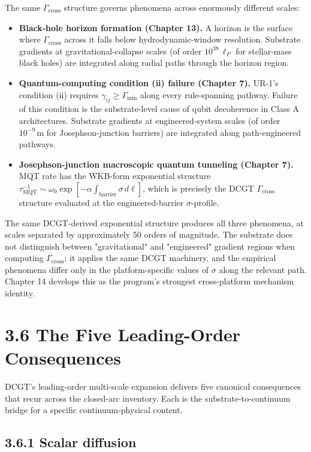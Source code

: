 \documentclass[11pt]{book}
\begin{document}
The same $\Gamma_\mathrm{cross}$ structure governs phenomena across enormously different scales:

\begin{itemize}
\item \textbf{Black-hole horizon formation (Chapter 13).} A horizon is the surface where $\Gamma_\mathrm{cross}$ across it falls below hydrodynamic-window resolution. Substrate gradients at gravitational-collapse scales (of order $10^{38}\,\ell_P$ for stellar-mass black holes) are integrated along radial paths through the horizon region.
\item \textbf{Quantum-computing condition (ii) failure (Chapter 7).} UR-1's condition (ii) requires $\gamma_{ij} \geq \Gamma_\mathrm{min}$ along every rule-spanning pathway. Failure of this condition is the substrate-level cause of qubit decoherence in Class A architectures. Substrate gradients at engineered-system scales (of order $10^{-9}\,\mathrm{m}$ for Josephson-junction barriers) are integrated along path-engineered pathways.
\item \textbf{Josephson-junction macroscopic quantum tunneling (Chapter 7).} MQT rate has the WKB-form exponential structure $\tau_\mathrm{MQT}^{-1} \sim \omega_0 \exp[-\alpha\int_\mathrm{barrier}\sigma\,d\ell]$, which is precisely the DCGT $\Gamma_\mathrm{cross}$ structure evaluated at the engineered-barrier $\sigma$-profile.
\end{itemize}

The same DCGT-derived exponential structure produces all three phenomena, at scales separated by approximately 50 orders of magnitude. The substrate does not distinguish between "gravitational" and "engineered" gradient regions when computing $\Gamma_\mathrm{cross}$; it applies the same DCGT machinery, and the empirical phenomena differ only in the platform-specific values of $\sigma$ along the relevant path. Chapter 14 develops this as the program's strongest cross-platform mechanism identity.

\section{3.6 The Five Leading-Order Consequences}

DCGT's leading-order multi-scale expansion delivers five canonical consequences that recur across the closed-arc inventory. Each is the substrate-to-continuum bridge for a specific continuum-physical content.

\subsection{3.6.1 Scalar diffusion}
\end{document}
